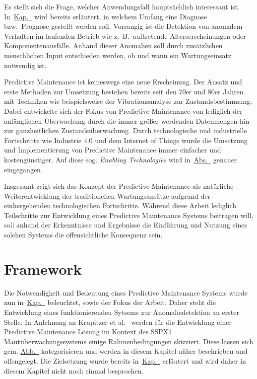 Es stellt sich die Frage, welcher Anwendungsfall hauptsächlich interessant ist. In~\hyperref[ch:zielsetzung]{Kap.~}
wird bereits erläutert, in welchem Umfang eine Diagnose bzw.~Prognose gestellt werden soll. Vorrangig ist die Detektion von anomalem
Verhalten im laufenden Betrieb wie z.~B.~auftretende Alterserscheinungen oder Komponentenausfälle. Anhand dieser Anomalien soll durch
zusätzlichen menschlichen Input entschieden werden, ob und wann ein Wartungseinsatz notwendig ist.

Predictive Maintenance ist keineswegs eine neue Erscheinung. Der Ansatz und erste Methoden zur Umsetzung bestehen bereits seit den 70er
und 80er Jahren~\cite{Sandtorv1973, Renwick1985} mit Techniken wie beispielsweise der Vibrationsanalyse zur Zustandsbestimmung. Dabei
entwickelte sich der Fokus von Predictive Maintenance von lediglich der anfänglichen Überwachung durch die immer größer werdenden
Datenmengen hin zur ganzheitlichen Zustandsüberwachung. Durch technologische und industrielle Fortschritte wie Industrie 4.0 und dem
Internet of Things wurde die Umsetzung und Implementierung von Predictive Maintenance immer einfacher und kostengünstiger. Auf diese sog.
\textit{Enabling Technologies} wird in~\hyperref[sec:technologische_grundlagen]{Abs.~} genauer
eingegangen.

Insgesamt zeigt sich das Konzept der Predictive Maintenance als natürliche Weiterentwicklung der traditionellen Wartungsansätze aufgrund
der einhergehenden technologischen Fortschritte. Während diese Arbeit lediglich Teilschritte zur Entwicklung eines Predictive Maintenance
Systems beitragen will, soll anhand der Erkenntnisse und Ergebnisse die Einführung und Nutzung eines solchen Systems die offensichtliche
Konsequenz sein.

\section{Framework}\label{sec:framework}
Die Notwendigkeit und Bedeutung eines Predictive Maintenance Systems wurde nun in~\hyperref[ch:pdm_theorie]{Kap.~}
beleuchtet, sowie der Fokus der Arbeit. Daher steht die Entwicklung eines funktionierenden Sytsems zur Anomaliedetektion an erster Stelle.
In Anlehnung an Krupitzer et al.~\cite{Krupitzer2020} werden für die Entwicklung einer Predictive Maintenance Lösung im Kontext des SSPX1
Mautüberwachungssystems einige Rahmenbedingungen skizziert. Diese lassen sich gem.
\hyperref[fig:pdm_framework]{Abb.~} kategorisieren und werden in diesem Kapitel näher beschrieben und offengelegt.
Die Zielsetzung wurde bereits in~\hyperref[ch:zielsetzung]{Kap.~} erläutert und wird daher in diesem Kapitel nicht
noch einmal besprochen.

